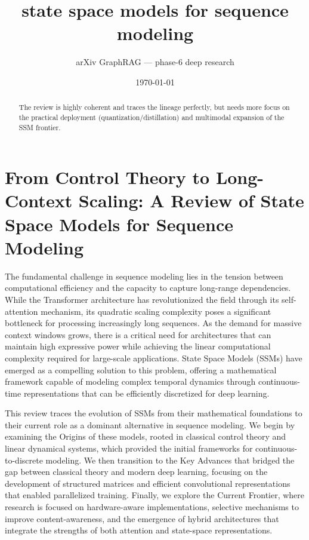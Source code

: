 \documentclass[11pt]{article}
\title{state space models for sequence modeling}
\author{arXiv GraphRAG --- phase-6 deep research}
\date{\today}
\begin{document}
\maketitle

\begin{abstract}
The review is highly coherent and traces the lineage perfectly, but needs more focus on the practical deployment (quantization/distillation) and multimodal expansion of the SSM frontier.
\end{abstract}

\section{From Control Theory to Long-Context Scaling: A Review of State Space Models for Sequence Modeling}

The fundamental challenge in sequence modeling lies in the tension between computational efficiency and the capacity to capture long-range dependencies. While the Transformer architecture has revolutionized the field through its self-attention mechanism, its quadratic scaling complexity poses a significant bottleneck for processing increasingly long sequences. As the demand for massive context windows grows, there is a critical need for architectures that can maintain high expressive power while achieving the linear computational complexity required for large-scale applications. State Space Models (SSMs) have emerged as a compelling solution to this problem, offering a mathematical framework capable of modeling complex temporal dynamics through continuous-time representations that can be efficiently discretized for deep learning.

This review traces the evolution of SSMs from their mathematical foundations to their current role as a dominant alternative in sequence modeling. We begin by examining the Origins of these models, rooted in classical control theory and linear dynamical systems, which provided the initial frameworks for continuous-to-discrete modeling. We then transition to the Key Advances that bridged the gap between classical theory and modern deep learning, focusing on the development of structured matrices and efficient convolutional representations that enabled parallelized training. Finally, we explore the Current Frontier, where research is focused on hardware-aware implementations, selective mechanisms to improve content-awareness, and the emergence of hybrid architectures that integrate the strengths of both attention and state-space representations.
\end{document}
